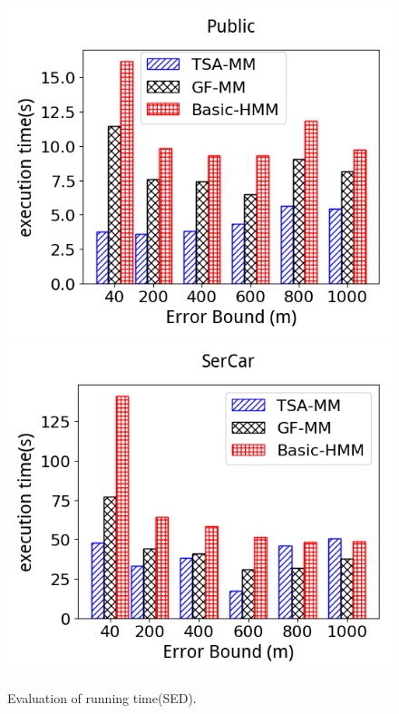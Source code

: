 \begin{figure}[tb!]
	\centering
  \includegraphics[scale=0.3]{Figures/Exp-epsilon-time-CISED-RPI-Public.png}
  \includegraphics[scale=0.3]{Figures/Exp-epsilon-time-CISED-RPI-SerCar.png}
	\vspace{-2ex}
  \caption{\small Evaluation of running time(SED).}
	\label{fig:rmf-epsilon-time-sed}
	\vspace{-3ex}
\end{figure}

